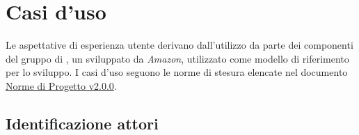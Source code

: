 \documentclass{scalatekids-article}
\begin{document}
\section{Casi d'uso}

Le aspettative di esperienza utente derivano dall'utilizzo da parte dei
componenti del gruppo di , un 
 sviluppato da \textit{Amazon}, utilizzato come modello di
riferimento per lo sviluppo. I casi d'uso seguono le norme di stesura elencate
nel documento \href{run:../Interni/NormeDiProgetto\_v2.0.0.pdf}{Norme di
  Progetto v2.0.0}.

\subsection{Identificazione attori}
\end{document}
